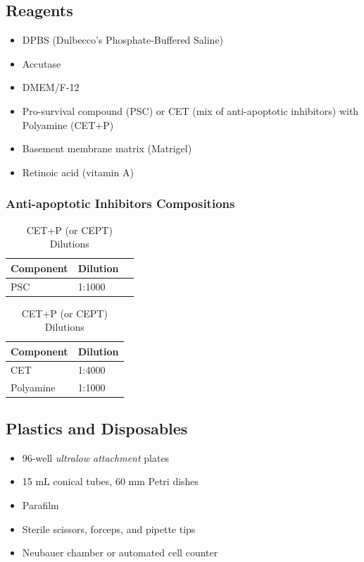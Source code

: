 \documentclass[11pt]{article}
\begin{document}
\subsection{Reagents}
\begin{itemize}[leftmargin=*]
    \item DPBS (Dulbecco’s Phosphate-Buffered Saline)
    \item Accutase
    \item DMEM/F-12
    \item Pro-survival compound (PSC) or CET (mix of anti-apoptotic inhibitors) with Polyamine (CET+P)
    \item Basement membrane matrix (Matrigel)
    \item Retinoic acid (vitamin A)
\end{itemize}

\subsubsection{Anti-apoptotic Inhibitors Compositions}

\begin{table}[H]
    \begin{minipage}{0.45\textwidth}
        \centering
        \caption{PSC Dilutions}
        \label{tab:psc}
        \begin{tabular}{lll}
        \hline
        \textbf{Component} & \textbf{Dilution} \\
        \hline
        PSC & 1:1000 \\
        \hline
        \end{tabular}
    \end{minipage}
    \hfill
    \begin{minipage}{0.45\textwidth}
        \centering
        \caption{CET+P (or CEPT) Dilutions}
        \label{tab:cetp}
        \begin{tabular}{ll}
        \hline
        \textbf{Component} & \textbf{Dilution} \\
        \hline
        CET & 1:4000 \\
        Polyamine & 1:1000 \\
        \hline
        \end{tabular}
    \end{minipage}
    \end{table}

\subsection{Plastics and Disposables}
\begin{itemize}[leftmargin=*]
    \item 96-well \textit{ultralow attachment} plates
    \item 15 mL conical tubes, 60 mm Petri dishes
    \item Parafilm
    \item Sterile scissors, forceps, and pipette tips
    \item Neubauer chamber or automated cell counter
\end{itemize}
\end{document}

